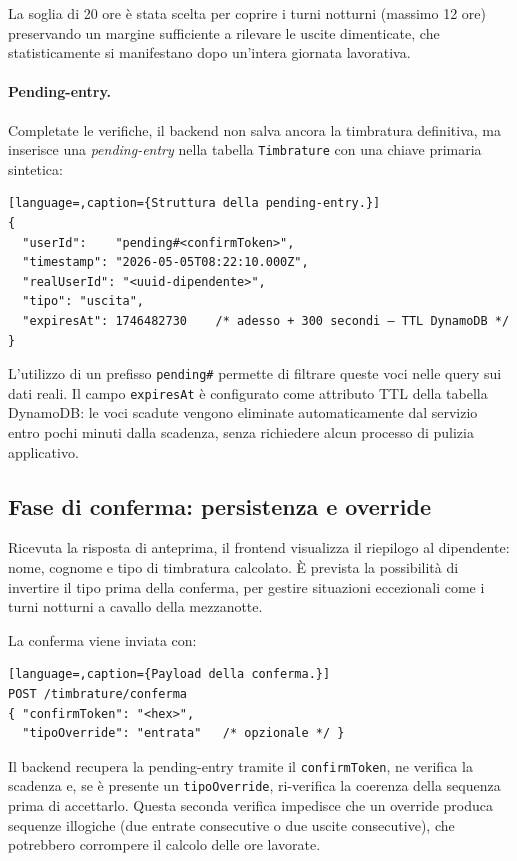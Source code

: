 La soglia di 20 ore è stata scelta per coprire i turni notturni
(massimo 12 ore) preservando un margine sufficiente a rilevare le
uscite dimenticate, che statisticamente si manifestano dopo un'intera
giornata lavorativa.

\paragraph{Pending-entry.}
Completate le verifiche, il backend non salva ancora la timbratura
definitiva, ma inserisce una \emph{pending-entry} nella tabella
\texttt{Timbrature} con una chiave primaria sintetica:

\begin{lstlisting}[language=,caption={Struttura della pending-entry.}]
{
  "userId":    "pending#<confirmToken>",
  "timestamp": "2026-05-05T08:22:10.000Z",
  "realUserId": "<uuid-dipendente>",
  "tipo": "uscita",
  "expiresAt": 1746482730    /* adesso + 300 secondi — TTL DynamoDB */
}
\end{lstlisting}

L'utilizzo di un prefisso \texttt{pending\#} permette di filtrare
queste voci nelle query sui dati reali. Il campo \texttt{expiresAt}
è configurato come attributo \textsc{TTL} della tabella DynamoDB:
le voci scadute vengono eliminate automaticamente dal servizio entro
pochi minuti dalla scadenza, senza richiedere alcun processo di pulizia
applicativo.

\subsection{Fase di conferma: persistenza e override}
\label{subsec:conferma}

Ricevuta la risposta di anteprima, il frontend visualizza il riepilogo
al dipendente: nome, cognome e tipo di timbratura calcolato. È prevista
la possibilità di invertire il tipo prima della conferma, per gestire
situazioni eccezionali come i turni notturni a cavallo della mezzanotte.

La conferma viene inviata con:

\begin{lstlisting}[language=,caption={Payload della conferma.}]
POST /timbrature/conferma
{ "confirmToken": "<hex>",
  "tipoOverride": "entrata"   /* opzionale */ }
\end{lstlisting}

Il backend recupera la pending-entry tramite il \texttt{confirmToken},
ne verifica la scadenza e, se è presente un \texttt{tipoOverride},
ri-verifica la coerenza della sequenza prima di accettarlo. Questa
seconda verifica impedisce che un override produca sequenze illogiche
(due entrate consecutive o due uscite consecutive), che potrebbero
corrompere il calcolo delle ore lavorate.

